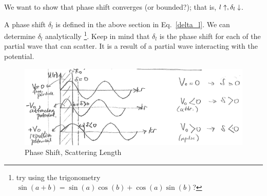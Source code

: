 \documentclass{school-22.101-notes}
\date{October 26, 2011}
\begin{document}
\maketitle


We want to show that phase shift converges (or bounded?); that is, $l \uparrow, \delta_l \downarrow$. 

A phase shift $\delta_l$ is defined in the above section in Eq.~\ref{delta_l}. We can determine $\delta_l$ analytically \footnote{try using the trigonometry $\sin(a+b) = \sin(a) \cos (b) + \cos(a) \sin(b)$?}. Keep in mind that $\delta_l$ is the phase shift for each of the partial wave that can scatter. It is a result of a partial wave interacting with the potential.  
\begin{figure}[ht]
    \centering
    \includegraphics[width=6in]{images/scattering/scattering-potential-phase-shift.png}
    \caption{Phase Shift, Scattering Length }
\end{figure}
\end{document}
